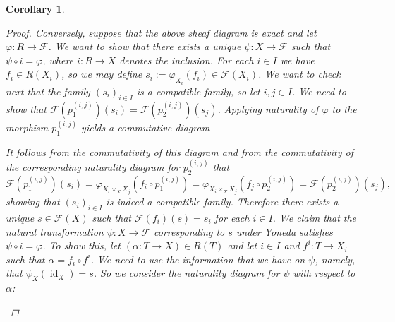 \documentclass[12pt,reqno,a4paper]{amsart}
\theoremstyle{plain}
\newtheorem{cor}[thm]{Corollary}
\theoremstyle{definition}
\theoremstyle{remark}
\begin{document}
\begin{cor}
\begin{proof}
    Conversely, suppose that the above sheaf diagram is exact and let $\varphi \colon R \to \mathscr{F}$.
    We want to show that there exists a unique $\psi \colon X \to \mathscr{F}$ such that $\psi \circ i = \varphi$, where $i \colon R \to X$ denotes the inclusion.
    For each $i \in I$ we have $f_{i} \in R(X_{i})$, so we may define $s_{i} := \varphi_{X_{i}}(f_{i}) \in \mathscr{F}(X_{i})$.
    We want to check next that the family $(s_{i})_{i \in I}$ is a compatible family, so let $i, j \in I$.
    We need to show that $\mathscr{F}(p_{1}^{(i,j)})(s_{i}) = \mathscr{F}(p_{2}^{(i,j)})(s_{j})$.
    Applying naturality of $\varphi$ to the morphism $p_{1}^{(i,j)}$ yields a commutative diagram
    \begin{center}
    \end{center}
    It follows from the commutativity of this diagram and from the commutativity of the corresponding naturality diagram for $p_{2}^{(i,j)}$ that
    \[ \mathscr{F}(p_{1}^{(i,j)})(s_{i}) = \varphi_{X_{i} \times_{X} X_{j}}(f_{i} \circ p_{1}^{(i,j)}) = \varphi_{X_{i} \times_{X} X_{j}}(f_{j} \circ p_{2}^{(i,j)}) = \mathscr{F}(p_{2}^{(i,j)})(s_{j}), \]
    showing that $(s_{i})_{i \in I}$ is indeed a compatible family.
    Therefore there exists a unique $s \in \mathscr{F}(X)$ such that $\mathscr{F}(f_{i})(s) = s_{i}$ for each $i \in I$.
    We claim that the natural transformation $\psi \colon X \to \mathscr{F}$ corresponding to $s$ under Yoneda satisfies $\psi \circ i = \varphi$.
    To show this, let $(\alpha \colon T \to X) \in R(T)$ and let $i \in I$ and $f^{i} \colon T \to X_{i}$ such that $\alpha = f_{i} \circ f^{i}$.
    We need to use the information that we have on $\psi$, namely, that $\psi_{X}(\operatorname{id}_{X}) = s$.
    So we consider the naturality diagram for $\psi$ with respect to $\alpha$:
    \begin{center}

\end{center}
\end{proof}
\end{cor}
\end{document}
